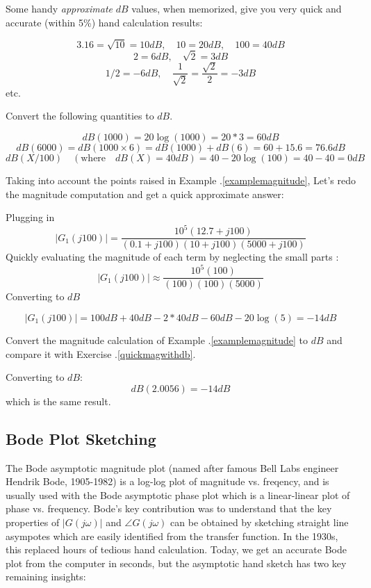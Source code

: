 Some handy {\it approximate} $dB$ values, when  memorized, give you very quick and accurate (within 5\%) hand calculation results:

\[
3.16 = \sqrt{10} = 10dB ,\quad 10 = 20dB, \quad 100 = 40dB
\]
\[
2 = 6dB, \quad   \sqrt{2} = 3dB
\]
\[
1/2 = -6dB, \quad \frac{1}{\sqrt{2}} = \frac{\sqrt{2}}{2} = -3dB
\]
etc.


\begin{ExampleSmall}
Convert the following quantities to $dB$.

\[
dB(1000) = 20\log(1000) = 20*3 = 60dB
\]
\[
dB(6000) = dB(1000\times6) = dB(1000) + dB(6)  = 60 + 15.6 = 76.6dB
\]
\[
dB(X/100) \quad (\mathrm{where }\quad dB(X)=40dB) = 40 - 20\log(100) = 40-40 = 0dB
\]

\end{ExampleSmall}


\begin{ExampleSmall}\label{quickmagwithdb}
Taking into account the points raised in Example \thechapter.\ref{examplemagnitude}, Let's redo the magnitude computation and get a quick approximate answer:


Plugging in
\[
|G_1(j100)| = \frac {10^5(12.7 + j100)}     {(0.1+j100)(10+j100)(5000+j100)}
\]
Quickly evaluating the magnitude of each term by neglecting the small parts :
\[
|G_1(j100)| \approx \frac {10^5(100)}     {(100)(100)(5000)}
\]
Converting to $dB$


\[
|G_1(j100)| = 100dB + 40dB - 2*40dB - 60dB - 20\log(5) = -14dB
\]


\end{ExampleSmall}


\begin{ExampleSmall}
Convert the magnitude calculation of Example \thechapter.\ref{examplemagnitude} to $dB$ and compare it with Exercise \thechapter.\ref{quickmagwithdb}.


Converting to $dB$:
\[
dB(2.0056) = -14dB
\]
which is the same result.
\end{ExampleSmall}

\subsection{Bode Plot Sketching}\label{BodePlotAsymptoticApprox}

The Bode asymptotic magnitude plot (named after famous Bell Labs engineer Hendrik Bode, 1905-1982)
is a log-log plot of magnitude vs. freqency, and is usually used with the Bode asymptotic phase plot which is a linear-linear plot of phase vs. frequency.  Bode's key contribution was to understand that the key properties of $|G(j\omega)|$ and $\angle G(j\omega)$ can be obtained by sketching straight line asympotes which are easily identified from the transfer function.   In the 1930s, this replaced hours of tedious hand calculation.   Today, we get an accurate Bode plot from the computer in seconds, but the asymptotic hand sketch has two key remaining insights:


